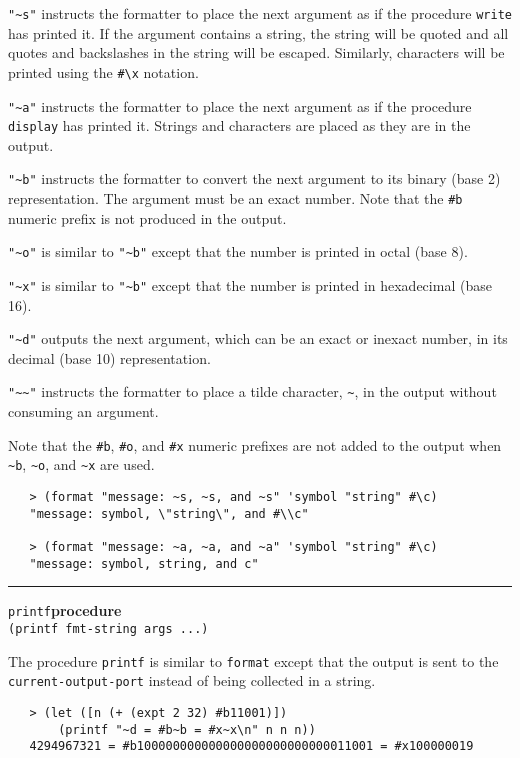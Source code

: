 \documentclass[onecolumn, 12pt, twoside, openright, dvipdfm]{book}
\makeatletter
\newcommand{\idxlabeldefun}[5]{
\vspace{1ex}
\rule{\textwidth}{2pt}
{\phantomsection\index{#1@\texttt{#2}}\label{#3}{\Large\texttt{#4}}\hfill\textbf{#5}}\\}
\newcommand{\idxdefun}[3]{\idxlabeldefun{#1}{#2}{#1}{#2}{#3}}
\newcommand{\defun}[2]{\idxdefun{#1}{#1}{#2}}
\makeatother
\begin{document}
\verb|"~s"| instructs the formatter to place the next argument
as if the procedure \texttt{write} has printed it.  If the argument
contains a string, the string will be quoted and all quotes and
backslashes in the string will be escaped.  Similarly, characters
will be printed using the \verb|#\x| notation.

\verb|"~a"| instructs the formatter to place the next argument
as if the procedure \texttt{display} has printed it.  Strings and
characters are placed as they are in the output.

\verb|"~b"| instructs the formatter to convert the next
argument to its binary (base 2) representation.  The argument must be an
exact number.  Note that the \texttt{\#b} numeric prefix is not
produced in the output.

\verb|"~o"| is similar to \verb|"~b"|  except that
the number is printed in octal (base 8).

\verb|"~x"|  is similar to \verb|"~b"|  except that
the number is printed in hexadecimal (base 16).

\verb|"~d"|  outputs the next argument, which can be an
exact or inexact number, in its decimal (base 10) representation.

\verb|"~~"|  instructs the formatter to place a tilde
character, \verb|~|, in the output without consuming an
argument.

Note that the \texttt{\#b}, \texttt{\#o}, and \texttt{\#x} numeric
prefixes are not added to the output when \verb|~b|, \verb|~o|, and
\verb|~x| are used.

\begin{verbatim}
   > (format "message: ~s, ~s, and ~s" 'symbol "string" #\c)
   "message: symbol, \"string\", and #\\c"

   > (format "message: ~a, ~a, and ~a" 'symbol "string" #\c)
   "message: symbol, string, and c"
\end{verbatim}

\defun{printf}{procedure}
\texttt{(printf fmt-string args ...)}

The procedure \texttt{printf} is similar to \texttt{format} except
that the output is sent to the \texttt{current-output-port} instead
of being collected in a string.

\begin{verbatim}
   > (let ([n (+ (expt 2 32) #b11001)])
       (printf "~d = #b~b = #x~x\n" n n n))
   4294967321 = #b100000000000000000000000000011001 = #x100000019
\end{verbatim}
\end{document}
